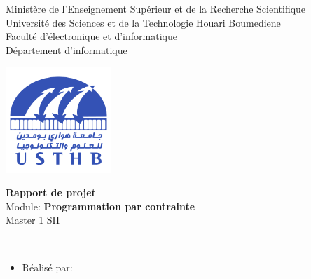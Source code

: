 \documentclass[12pt]{report}
\begin{document}
\begin{center}
\normalsize{Ministère de l'Enseignement Supérieur et de la Recherche Scientifique}\\
\normalsize{Université des Sciences et de la Technologie Houari Boumediene}\\
\normalsize{Faculté d'électronique et d'informatique}\\
\normalsize{Département d'informatique}\\
\end{center}
\begin{center}
\includegraphics[width=4cm,height=4cm]{usthb.png}
\end{center}

\begin{center}
\Huge{\textbf{Rapport de projet}}\\
\vspace{0.7cm}
\large{Module: \textbf{Programmation par contrainte}}\\
\vspace{0.2cm}
\large{Master 1 SII}\\
\vspace{1.5cm}
\end{center}
\vspace{3cm}
\\
\begin{itemize}
    \item{Réalisé par:}
\end{itemize}

\vspace{3cm}
\end{document}
